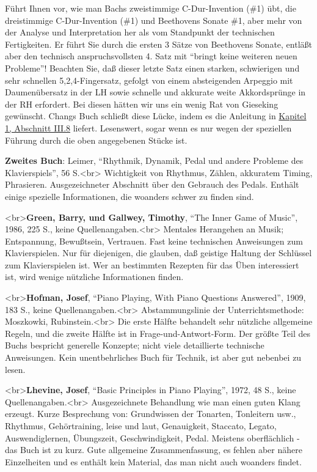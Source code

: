 Führt Ihnen vor, wie man Bachs zweistimmige C-Dur-Invention (\#1) übt, die dreistimmige C-Dur-Invention (\#1) und Beethovens Sonate \#1, aber mehr von der Analyse und Interpretation her als vom Standpunkt der technischen Fertigkeiten.
Er führt Sie durch die ersten 3 Sätze von Beethovens Sonate, entläßt aber den technisch anspruchsvollsten 4. Satz mit \enquote{bringt keine weiteren neuen Probleme}!
Beachten Sie, daß dieser letzte Satz einen starken, schwierigen und sehr schnellen 5,2,4-Fingersatz, gefolgt von einem absteigenden Arpeggio mit Daumenübersatz in der LH sowie schnelle und akkurate weite Akkordsprünge in der RH erfordert.
Bei diesen hätten wir uns ein wenig Rat von Gieseking gewünscht.
Changs Buch schließt diese Lücke, indem es die Anleitung in \hyperlink{c1iii8}{Kapitel 1, Abschnitt III.8} liefert.
Lesenswert, sogar wenn es nur wegen der speziellen Führung durch die oben angegebenen Stücke ist.

\textbf{Zweites Buch}: Leimer, \enquote{Rhythmik, Dynamik, Pedal und andere Probleme des Klavierspiels}, 56 S.<br>
Wichtigkeit von Rhythmus, Zählen, akkuratem Timing, Phrasieren.
Ausgezeichneter Abschnitt über den Gebrauch des Pedals.
Enthält einige spezielle Informationen, die woanders schwer zu finden sind.


\hypertarget{Green}{}

<br>\textbf{Green, Barry, und Gallwey, Timothy}, \enquote{The Inner Game of Music}, 1986, 225 S., keine Quellenangaben.<br>
 Mentales Herangehen an Musik; Entspannung, Bewußtsein, Vertrauen.
Fast keine technischen Anweisungen zum Klavierspielen.
Nur für diejenigen, die glauben, daß geistige Haltung der Schlüssel zum Klavierspielen ist.
Wer an bestimmten Rezepten für das Üben interessiert ist, wird wenige nützliche Informationen finden.


\hypertarget{Hofman}{}

<br>\textbf{Hofman, Josef}, \enquote{Piano Playing, With Piano Questions Answered}, 1909, 183 S., keine Quellenangaben.<br>
Abstammungslinie der Unterrichtsmethode: Moszkowki, Rubinstein.<br>
Die erste Hälfte behandelt sehr nützliche allgemeine Regeln, und die zweite Hälfte ist in Frage-und-Antwort-Form.
Der größte Teil des Buchs bespricht generelle Konzepte; nicht viele detaillierte technische Anweisungen.
Kein unentbehrliches Buch für Technik, ist aber gut nebenbei zu lesen.


\hypertarget{Lhevine}{}

<br>\textbf{Lhevine, Josef}, \enquote{Basic Principles in Piano Playing}, 1972, 48 S., keine Quellenangaben.<br> Ausgezeichnete Behandlung wie man einen guten Klang erzeugt.
Kurze Besprechung von: Grundwissen der Tonarten, Tonleitern usw., Rhythmus, Gehörtraining, leise und laut, Genauigkeit, Staccato, Legato, Auswendiglernen, Übungszeit, Geschwindigkeit, Pedal.
Meistens oberflächlich - das Buch ist zu kurz.
Gute allgemeine Zusammenfassung, es fehlen aber nähere Einzelheiten und es enthält kein Material, das man nicht auch woanders findet.


